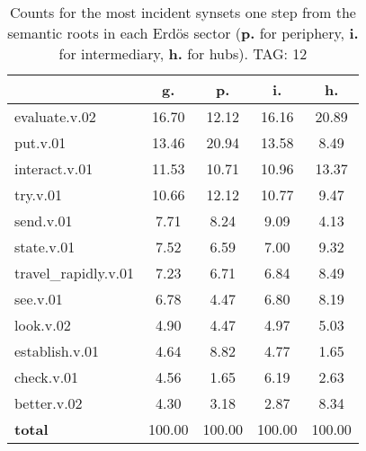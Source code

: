 \begin{table}[h!]
\begin{center}
\begin{tabular}{| l | c | c | c | c |}\hline
 & g. & p. & i. & h. \\\hline
evaluate.v.02 & 16.70  & 12.12  & 16.16  & 20.89 \\\hline
put.v.01 & 13.46  & 20.94  & 13.58  & 8.49 \\\hline
interact.v.01 & 11.53  & 10.71  & 10.96  & 13.37 \\\hline
try.v.01 & 10.66  & 12.12  & 10.77  & 9.47 \\\hline
send.v.01 & 7.71  & 8.24  & 9.09  & 4.13 \\\hline
state.v.01 & 7.52  & 6.59  & 7.00  & 9.32 \\\hline
travel\_rapidly.v.01 & 7.23  & 6.71  & 6.84  & 8.49 \\\hline
see.v.01 & 6.78  & 4.47  & 6.80  & 8.19 \\\hline
look.v.02 & 4.90  & 4.47  & 4.97  & 5.03 \\\hline
establish.v.01 & 4.64  & 8.82  & 4.77  & 1.65 \\\hline
check.v.01 & 4.56  & 1.65  & 6.19  & 2.63 \\\hline
better.v.02 & 4.30  & 3.18  & 2.87  & 8.34 \\\hline
{{\bf total}} & 100.00  & 100.00  & 100.00  & 100.00 \\\hline
\end{tabular}
\caption{Counts for the most incident synsets one step from the semantic roots in each Erd\"os sector ({\bf p.} for periphery, {\bf i.} for intermediary, {\bf h.} for hubs). TAG: 12}
\end{center}
\end{table}